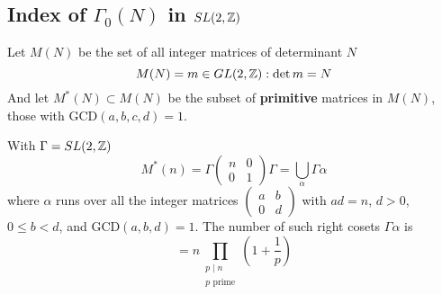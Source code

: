 \documentclass[a4paper]{article}
\begin{document}
\subsection[Index of $\Gamma_0(N)$ in $SL(2,\Z)$]{Index of $\Gamma_0(N)$ in $SL(2,\Z)$}
Let $M(N)$ be the set of all integer matrices of determinant $N$
\[M(N) = {m \in GL(2,\mathbb{Z}) : \det{m} = N }\]
And let $M^{*}(N) \subset M(N)$ be the subset of \textbf{primitive} matrices in $M(N)$, those with GCD$(a,b,c,d) = 1$. 
\begin{lemma}
    With $\Gamma = SL(2,\mathbb{Z})$
    \begin{equation}
        M^{*}(n) = \Gamma \begin{pmatrix}
            n & 0 \\
            0 & 1
        \end{pmatrix} \Gamma = \bigcup_{\alpha} \Gamma\alpha
    \end{equation}
    where $\alpha$ runs over all the integer matrices $\begin{pmatrix}
        a & b \\ 0 & d
    \end{pmatrix}$ with $ad=n$, $d>0$, $0 \leq b < d$, and GCD$(a,b,d)=1$. The number of such right cosets $\Gamma \alpha$ is
    \begin{equation}
        [M^{*}(n):\Gamma]= n \prod_{\substack{p \mid n \\ p \text{ prime}}} (1 + \frac{1}{p})
    \end{equation}
\end{lemma}
\end{document}
